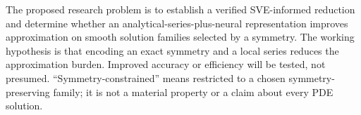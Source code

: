 \documentclass[12pt,a4paper]{article}
\begin{document}
The proposed research problem is to establish a verified SVE-informed reduction and determine whether an analytical-series-plus-neural representation improves approximation on smooth solution families selected by a symmetry. The working hypothesis is that encoding an exact symmetry and a local series reduces the approximation burden. Improved accuracy or efficiency will be tested, not presumed. ``Symmetry-constrained'' means restricted to a chosen symmetry-preserving family; it is not a material property or a claim about every PDE solution.

\newpage
\end{document}
